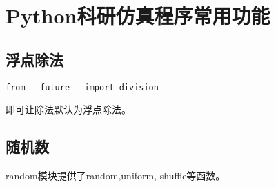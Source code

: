 \section{Python科研仿真程序常用功能}

\subsection{浮点除法}
\begin{lstlisting}
from __future__ import division
\end{lstlisting}
即可让除法默认为浮点除法。
\subsection{随机数}
random模块提供了random,uniform, shuffle等函数。
















